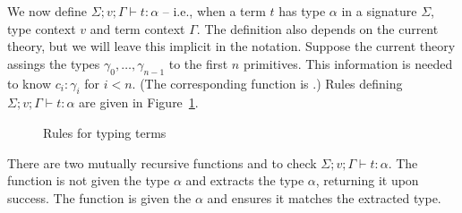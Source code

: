 We now define $\Sigma;v;\Gamma \vdash t : \alpha$ -- i.e.,
when a term $t$ has type $\alpha$ in a signature $\Sigma$, type context $v$
and term context $\Gamma$.
The definition also depends on the current theory, but we will leave this implicit in the notation.
Suppose the current theory assings the types $\gamma_0,\ldots,\gamma_{n-1}$ to the first $n$ primitives.
This information is needed to know $c_i:\gamma_i$ for $i<n$.
(The corresponding function is {}.)
Rules defining $\Sigma;v;\Gamma \vdash t : \alpha$ are given in Figure~\ref{fig:tmtp}.

\begin{figure}
\begin{center}
\end{center}
\caption{Rules for typing terms}\label{fig:tmtp}
\end{figure}

There are two mutually recursive functions
{} and {}
to check
$\Sigma;v;\Gamma \vdash t : \alpha$.
The function {} is not given the type $\alpha$
and extracts the type $\alpha$, returning it upon success.
The function {} is given the $\alpha$ and
ensures it matches the extracted type.

